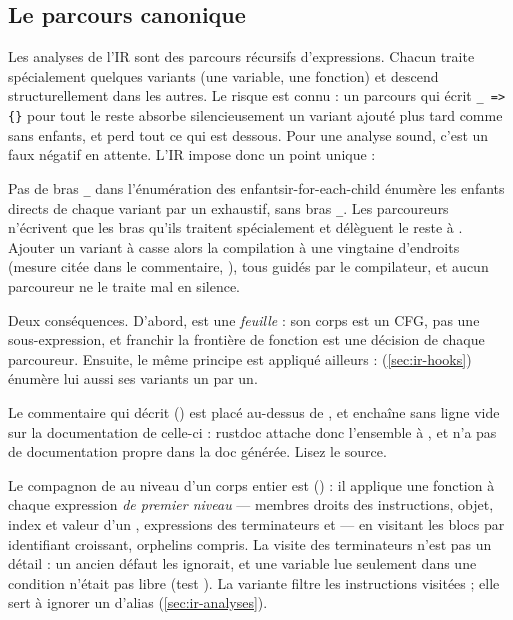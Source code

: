 \subsection{Le parcours canonique}

Les analyses de l'IR sont des parcours récursifs d'expressions. Chacun traite spécialement quelques variants (une variable, une fonction) et descend structurellement dans les autres. Le risque est connu : un parcours qui écrit \texttt{\_ => \{\}} pour \og tout le reste\fg{} absorbe silencieusement un variant ajouté plus tard comme \og sans enfants\fg{}, et perd tout ce qui est dessous. Pour une analyse sound, c'est un faux négatif en attente. L'IR impose donc un point unique :


\begin{invariant}{Pas de bras \texttt{\_} dans l'énumération des enfants}{ir-for-each-child}
 énumère les enfants directs de chaque variant par un  exhaustif, sans bras \texttt{\_}. Les parcoureurs n'écrivent que les bras qu'ils traitent spécialement et délèguent le reste à . Ajouter un variant à  casse alors la compilation à une vingtaine d'endroits (mesure citée dans le commentaire, ), tous guidés par le compilateur, et aucun parcoureur ne le traite mal en silence.
\end{invariant}

Deux conséquences. D'abord,  est une \emph{feuille} : son corps est un CFG, pas une sous-expression, et franchir la frontière de fonction est une décision de chaque parcoureur. Ensuite, le même principe est appliqué ailleurs :  (\cref{sec:ir-hooks}) énumère lui aussi ses variants un par un.

\begin{piege}
Le commentaire qui décrit  () est placé au-dessus de , et enchaîne sans ligne vide sur la documentation de celle-ci : rustdoc attache donc l'ensemble à , et  n'a pas de documentation propre dans la doc générée. Lisez le source.
\end{piege}

Le compagnon de  au niveau d'un corps entier est  () : il applique une fonction à chaque expression \emph{de premier niveau} --- membres droits des instructions, objet, index et valeur d'un , expressions des terminateurs  et  --- en visitant les blocs par identifiant croissant, orphelins compris. La visite des terminateurs n'est pas un détail : un ancien défaut les ignorait, et une variable lue seulement dans une condition n'était pas libre (test ). La variante  filtre les instructions visitées ; elle sert à ignorer un  d'alias (\cref{sec:ir-analyses}).

